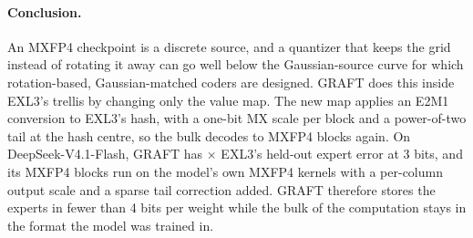 \paragraph{Conclusion.} An MXFP4 checkpoint is a discrete source, and a quantizer that keeps the grid instead of
rotating it away can go well below the Gaussian-source curve for which rotation-based, Gaussian-matched coders are
designed. GRAFT does this inside EXL3's
trellis by changing only the value map. The new map applies an E2M1 conversion to EXL3's hash, with a one-bit MX
scale per block and a power-of-two tail at the hash centre, so the bulk decodes to MXFP4 blocks again. On
DeepSeek-V4.1-Flash, GRAFT has $\times$ EXL3's held-out expert error at 3 bits, and its MXFP4 blocks
run on the model's own MXFP4 kernels with a per-column output scale and a sparse tail correction added. GRAFT
therefore stores the experts in fewer than 4 bits per weight while the bulk of the computation stays in the format the
model was trained in.
